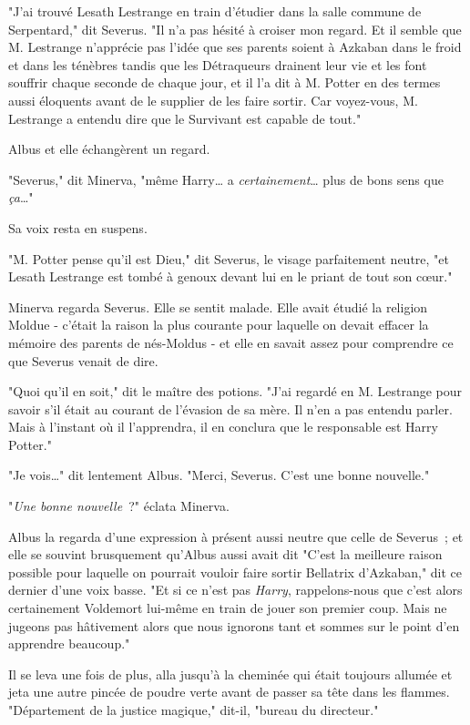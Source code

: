 "J'ai trouvé Lesath Lestrange en train d'étudier dans la salle commune de Serpentard," dit Severus. "Il n'a pas hésité à croiser mon regard. Et il semble que M. Lestrange n'apprécie pas l'idée que ses parents soient à Azkaban dans le froid et dans les ténèbres tandis que les Détraqueurs drainent leur vie et les font souffrir chaque seconde de chaque jour, et il l'a dit à M. Potter en des termes aussi éloquents avant de le supplier de les faire sortir. Car voyez-vous, M. Lestrange a entendu dire que le Survivant est capable de tout."

Albus et elle échangèrent un regard.

"Severus," dit Minerva, "même Harry… a \emph{certainement}… plus de bons sens que \emph{ça}…"

Sa voix resta en suspens.

"M. Potter pense qu'il est Dieu," dit Severus, le visage parfaitement neutre, "et Lesath Lestrange est tombé à genoux devant lui en le priant de tout son cœur."

Minerva regarda Severus. Elle se sentit malade. Elle avait étudié la religion Moldue - c'était la raison la plus courante pour laquelle on devait effacer la mémoire des parents de nés-Moldus - et elle en savait assez pour comprendre ce que Severus venait de dire.

"Quoi qu'il en soit," dit le maître des potions. "J'ai regardé en M. Lestrange pour savoir s'il était au courant de l'évasion de sa mère. Il n'en a pas entendu parler. Mais à l'instant où il l'apprendra, il en conclura que le responsable est Harry Potter."

"Je vois…" dit lentement Albus. "Merci, Severus. C'est une bonne nouvelle."

"\emph{Une bonne nouvelle}~?" éclata Minerva.

Albus la regarda d'une expression à présent aussi neutre que celle de Severus~; et elle se souvint brusquement qu'Albus aussi avait dit "C'est la meilleure raison possible pour laquelle on pourrait vouloir faire sortir Bellatrix d'Azkaban," dit ce dernier d'une voix basse. "Et si ce n'est pas \emph{Harry}, rappelons-nous que c'est alors certainement Voldemort lui-même en train de jouer son premier coup. Mais ne jugeons pas hâtivement alors que nous ignorons tant et sommes sur le point d'en apprendre beaucoup."

Il se leva une fois de plus, alla jusqu'à la cheminée qui était toujours allumée et jeta une autre pincée de poudre verte avant de passer sa tête dans les flammes. "Département de la justice magique," dit-il, "bureau du directeur."

